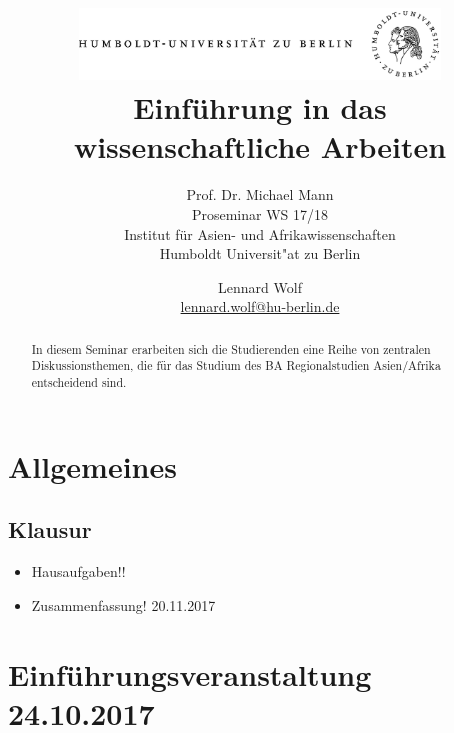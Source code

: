\documentclass[emulatestandardclasses]{scrartcl}
\date{\vspace{-3ex}}
\begin{document}
\title{
	\includegraphics*[bb=0 0 720 200, width=0.72\textwidth]{ErstesSem/images/hu_logo.png}\\
	\vspace{25pt}
	Einführung in das\\wissenschaftliche Arbeiten}
\subtitle{\vspace{10pt}
			Prof. Dr. Michael Mann\\
			Proseminar WS 17/18\\
          Institut für Asien- und Afrikawissenschaften\\ 
          Humboldt Universit"at zu Berlin}
\author{Lennard Wolf\\
        \small{\href{mailto:lennard.wolf@hu-berlin.de}{lennard.wolf@hu-berlin.de}}}
\maketitle
\begin{abstract}
In diesem Seminar erarbeiten sich die Studierenden eine Reihe von zentralen Diskussionsthemen, die für das Studium des BA Regionalstudien Asien/Afrika entscheidend sind.

\end{abstract}
\newpage

\newpage

\section{Allgemeines}

\subsection{Klausur}

\begin{itemize}
  \item Hausaufgaben!!
  \item Zusammenfassung! 20.11.2017
\end{itemize}


\section{Einführungsveranstaltung\\24.10.2017}
\end{document}
